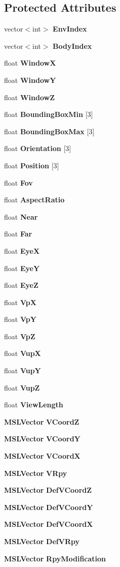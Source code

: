 \subsection*{Protected Attributes}
\begin{CompactItemize}
\item 
vector$<$int$>$ {\bf Env\-Index}
\item 
vector$<$int$>$ {\bf Body\-Index}
\item 
float {\bf Window\-X}
\item 
float {\bf Window\-Y}
\item 
float {\bf Window\-Z}
\item 
float {\bf Bounding\-Box\-Min} [3]
\item 
float {\bf Bounding\-Box\-Max} [3]
\item 
float {\bf Orientation} [3]
\item 
float {\bf Position} [3]
\item 
float {\bf Fov}
\item 
float {\bf Aspect\-Ratio}
\item 
float {\bf Near}
\item 
float {\bf Far}
\item 
float {\bf Eye\-X}
\item 
float {\bf Eye\-Y}
\item 
float {\bf Eye\-Z}
\item 
float {\bf Vp\-X}
\item 
float {\bf Vp\-Y}
\item 
float {\bf Vp\-Z}
\item 
float {\bf Vup\-X}
\item 
float {\bf Vup\-Y}
\item 
float {\bf Vup\-Z}
\item 
float {\bf View\-Length}
\item 
{\bf MSLVector} {\bf VCoord\-Z}
\item 
{\bf MSLVector} {\bf VCoord\-Y}
\item 
{\bf MSLVector} {\bf VCoord\-X}
\item 
{\bf MSLVector} {\bf VRpy}
\item 
{\bf MSLVector} {\bf Def\-VCoord\-Z}
\item 
{\bf MSLVector} {\bf Def\-VCoord\-Y}
\item 
{\bf MSLVector} {\bf Def\-VCoord\-X}
\item 
{\bf MSLVector} {\bf Def\-VRpy}
\item 
{\bf MSLVector} {\bf Rpy\-Modification}
\item 

\end{CompactItemize}
